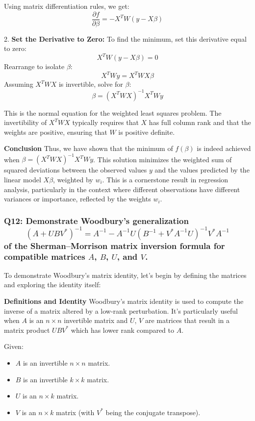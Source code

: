\documentclass[8pt]{article}
\begin{document}
   Using matrix differentiation rules, we get:
   \[
   \frac{\partial f}{\partial \beta} = -X^T W (y - X\beta)
   \]

2. \textbf{Set the Derivative to Zero:}
   To find the minimum, set this derivative equal to zero:
   \[
   X^T W (y - X\beta) = 0
   \]
   Rearrange to isolate \( \beta \):
   \[
   X^T W y = X^T W X \beta
   \]
   Assuming \( X^T W X \) is invertible, solve for \( \beta \):
   \[
   \beta = (X^T W X)^{-1} X^T W y
   \]

This is the normal equation for the weighted least squares problem. The invertibility of \( X^T W X \) typically requires that \( X \) has full column rank and that the weights are positive, ensuring that \( W \) is positive definite.

\textbf{Conclusion}
Thus, we have shown that the minimum of \( f(\beta) \) is indeed achieved when \( \beta = (X^T W X)^{-1} X^T W y \). This solution minimizes the weighted sum of squared deviations between the observed values \( y \) and the values predicted by the linear model \( X\beta \), weighted by \( w_i \). This is a cornerstone result in regression analysis, particularly in the context where different observations have different variances or importance, reflected by the weights \( w_i \).

\subsubsection*{Q12: Demonstrate Woodbury’s generalization
\[ (A + UBV^*)^{-1} = A^{-1} - A^{-1}U(B^{-1} + V^* A^{-1} U)^{-1} V^* A^{-1} \]
of the Sherman–Morrison matrix inversion formula for compatible matrices \(A\), \(B\), \(U\), and \(V\).}

To demonstrate Woodbury's matrix identity, let's begin by defining the matrices and exploring the identity itself:

\textbf{Definitions and Identity}
Woodbury's matrix identity is used to compute the inverse of a matrix altered by a low-rank perturbation. It's particularly useful when \(A\) is an \(n \times n\) invertible matrix and \(U\), \(V\) are matrices that result in a matrix product \(UBV^*\) which has lower rank compared to \(A\).

Given:
\begin{itemize}
    \item \(A\) is an invertible \(n \times n\) matrix.
    \item \(B\) is an invertible \(k \times k\) matrix.
    \item \(U\) is an \(n \times k\) matrix.
    \item \(V\) is an \(n \times k\) matrix (with \(V^*\) being the conjugate transpose).
\end{itemize}
\end{document}
